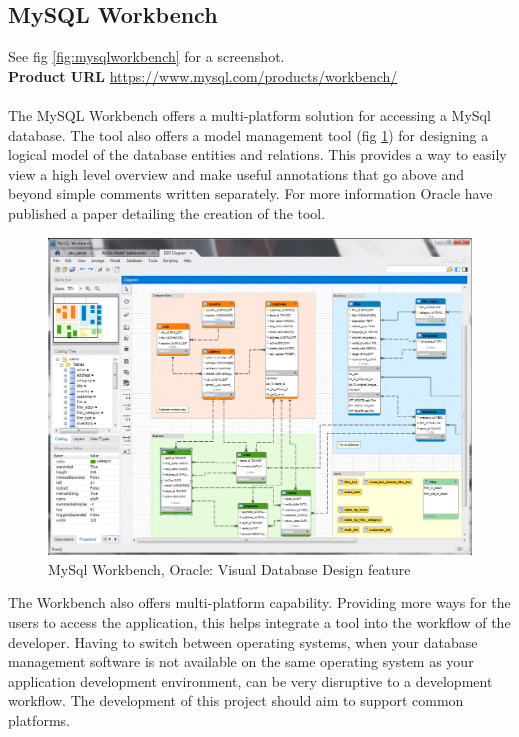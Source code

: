 \subsection{MySQL Workbench}\label{mysql-workbench}

\noindent
See fig \ref{fig:mysqlworkbench} for a screenshot.
\noindent\\
\textbf{Product URL}\cite{mysqlworkbench}
\url{https://www.mysql.com/products/workbench/}
\\
\\
\noindent
The MySQL Workbench offers a multi-platform solution for accessing a MySql
database. The tool also offers a model management tool (fig
\ref{fig:mysqlworkbenchmodel}) for designing a logical model of the database
entities and relations. This provides a way to easily view a high level
overview and make useful annotations that go above and beyond simple comments
written separately. For more information Oracle have published a paper
detailing the creation of the tool\cite{mysqlworkbenchmodeldesign}.

\begin{figure}
  \includegraphics[width=\linewidth]{Figures/MySqlWorkbenchModel.png}
  \caption{MySql Workbench, Oracle: Visual Database Design feature}
  \label{fig:mysqlworkbenchmodel}
\end{figure}

The Workbench also offers multi-platform capability. Providing more ways for the
users to access the application, this helps integrate a tool into the 
workflow of the developer. Having to switch between operating systems, when your database
management software is not available on the same operating system as your application
development environment, can be very disruptive to a development workflow. The
development of this project should aim to support common platforms.


